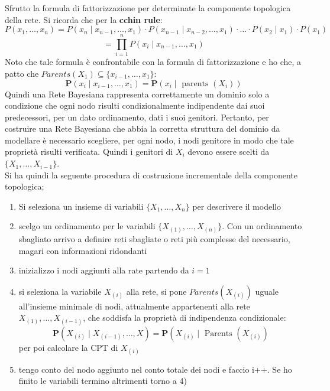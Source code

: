 \documentclass[a4paper,12pt, oneside]{book}
\begin{document}
Sfrutto la formula di fattorizzazione per determinate la
componente topologica della rete. Si ricorda che per la \textbf{cchin rule}:
\small{\[P\left(x_{1}, \ldots, x_{n}\right)=P\left(x_{n} \mid x_{n-1}, \ldots,
      x_{1}\right) \cdot P\left(x_{n-1} \mid x_{n-2}, \ldots, x_{1}\right) \cdot
    \ldots \cdot P\left(x_{2} \mid x_{1}\right) \cdot
    P\left(x_{1}\right)\]\[
    =\prod_{i=1}^n P\left(x_{i} \mid x_{n-1}, \ldots,
      x_{1}\right)\]}
Noto che tale formula è confrontabile con la formula di fattorizzazione e ho
che, a patto che $Parents(X_1)\subseteq \{x_{i-1},\ldots,x_1\}$:
\[\mathbf{P}\left(x_{i} \mid x_{i-1}, \ldots,
    x_{1}\right)=\mathbf{P}\left(x_{i} \mid \text { parents
    }\left(X_{i}\right)\right)\] 
Quindi una Rete Bayesiana rappresenta correttamente un dominio solo a
condizione che ogni nodo risulti condizionalmente indipendente dai suoi
predecessori, per un dato ordinamento, dati i suoi genitori. Pertanto, per
costruire una Rete Bayesiana che abbia la corretta struttura del dominio da
modellare è necessario scegliere, per ogni nodo, i nodi genitore in modo che
tale proprietà risulti verificata. Quindi i genitori di $X_i$ devono essere
scelti da $\{X_1,\ldots,X_{i-1}\}$.\\
Si ha quindi la seguente procedura di costruzione incrementale della
componente topologica;
\begin{enumerate}
  \item Si seleziona un insieme di variabili $\{X_1,\ldots, X_n\}$ per
  descrivere il modello
  \item scelgo un ordinamento per le variabili $\{X_{(1)},\ldots,
  X_{(n)}\}$. Con un ordinamento sbagliato arrivo a definire reti sbagliate o
  reti più complesse del necessario, magari con informazioni ridondanti
  \item inizializzo i nodi aggiunti alla rate partendo da $i=1$
  \item si seleziona la variabile $X_{(i)}$ alla rete, si pone
  $Parents(X_{(i)})$ uguale all’insieme minimale di nodi, attualmente
  appartenenti alla rete ${X_{(1)},\ldots, X_{(i-1)}}$, che soddisfa la
  proprietà di indipendenza condizionale:
  \[\mathbf{P}\left(X_{(i)} \mid X_{(i-1)}, \ldots,
      X\right)=\mathbf{P}\left(X_{(i)} \mid\right. \text { Parents
    }\left(X_{(i)}\right)\]
  per poi calcolare la CPT di $X_{(i)}$
  \item tengo conto del nodo aggiunto nel conto totale dei nodi e faccio
  i++. Se ho finito le variabili termino altrimenti torno a 4)
\end{enumerate}
\end{document}
